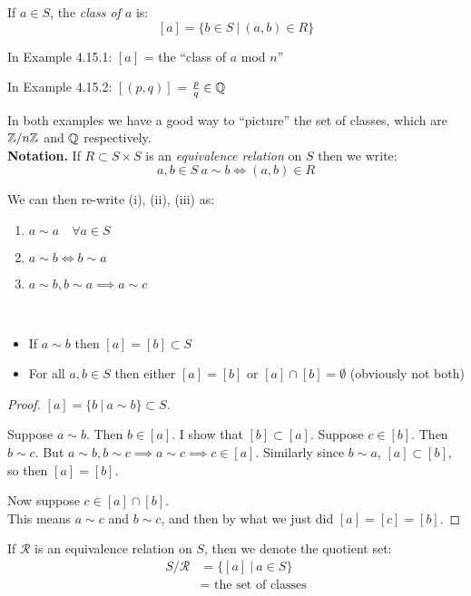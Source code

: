 \documentclass[twoside]{scrartcl}
\newcommand{\rel}{\mathcal{R}}
\begin{document}
\begin{definition}If $a \in S$, the \emph{class of $a$} is:
\[[a] = \{b \in S ~|~ (a,b) \in R\}\]
\end{definition}


In Example 4.15.1: $[a]$ = the ``class of $a$ mod $n$''

In Example 4.15.2: $[(p,q)]$ = $\frac{p}{q} \in \mathbb{Q}$

In both examples we have a good way to ``picture'' the set of classes, which are $\mathbb{Z} / n\mathbb{Z}$ and $\mathbb{Q}$ respectively.\\


\textbf{Notation.} If $R \subset S \times S$ is an \emph{equivalence relation} on $S$ then we write:\[a,b \in S~ a \sim b \iff (a,b) \in R\]

We can then re-write (i), (ii), (iii) as:
\begin{enumerate}
\item $a \sim a \quad \forall a\in S$	
\item $a \sim b \iff b \sim a$
\item $a \sim b, b \sim a \implies a \sim c$\\
\end{enumerate}

\begin{remarks}~
\begin{itemize}
\item If $a \sim b$ then $[a] = [b] \subset S$
\item For all $a,b\in S$ then either $[a] = [b]$ or $[a] \cap [b] = \emptyset$ (obviously not both)
\end{itemize}
\end{remarks}

\begin{proof}
	$[a] = \{b ~|~ a \sim b\} \subset S$. 
	
	Suppose $a \sim b$. Then $b \in [a]$. I show that $[b] \subset [a]$. Suppose $c \in [b]$. Then $b \sim c$. But $a \sim b, b\sim c \implies a \sim c \implies c \in [a]$. Similarly since $b \sim a$, $[a] \subset [b]$, so then $[a] = [b]$. 

Now suppose $c \in [a] \cap [b]$.\\ This means $a \sim c$ and $b \sim c$, and then by what we just did $[a] = [c] = [b]$. 
\end{proof}

\begin{definition} If $\rel $ is an equivalence relation on $S$, then we denote the quotient set:
\[
\begin{aligned}
  S/\rel &= \{[a] ~|~ a \in S\}\\
  &= \text{ the set of classes}
\end{aligned}
\]
\end{definition}
\end{document}
